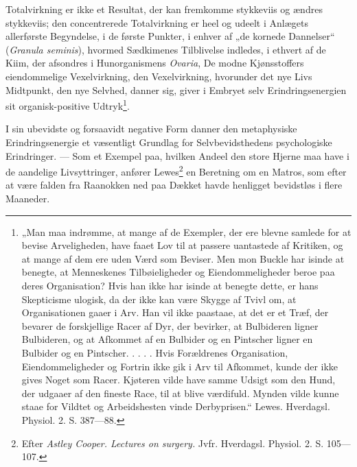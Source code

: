\documentclass[12pt,a4paper]{book}
\begin{document}
\setcounter{footnote}{0}
Totalvirkning er ikke et Resultat, der kan fremkomme stykkeviis og ændres
stykkeviis; den concentrerede Totalvirkning er heel og udeelt i Anlægets
allerførste Begyndelse, i de første Punkter, i enhver af „de kornede
Dannelser“ (\textit{Granula seminis}), hvormed Sædkimenes Tilblivelse
indledes, i ethvert af de Kiim, der afsondres i Hunorganismens
\textit{Ovaria},
De modne Kjønsstoffers eiendommelige Vexelvirkning, den Vexelvirkning,
hvorunder det nye Livs Midtpunkt, den nye Selvhed, danner sig, giver i
Embryet selv Erindringsenergien sit organisk-positive
Udtryk\footnote{„Man maa indrømme, at mange af de Exempler, der ere blevne
samlede for at bevise Arveligheden, have faaet Lov til at passere
uantastede af Kritiken, og at mange af dem ere uden Værd som Beviser. Men
mon Buckle har isinde at benegte, at Menneskenes Tilbøieligheder og
Eiendommeligheder beroe paa deres Organisation? Hvis han ikke har isinde
at benegte dette, er hans Skepticisme ulogisk, da der ikke kan være Skygge
af Tvivl om, at Organisationen gaaer i Arv. Han vil ikke paastaae, at det
er et Træf, der bevarer de forskjellige Racer af Dyr, der bevirker, at
Bulbideren ligner Bulbideren, og at Afkommet af en Bulbider og en Pintscher
ligner en Bulbider og en Pintscher. . . . . Hvis Forældrenes Organisation,
Eiendommeligheder og Fortrin ikke gik i Arv til Afkommet, kunde der ikke
gives Noget som Racer. Kjøteren vilde have samme Udsigt som den Hund, der
udgaaer af den fineste Race, til at blive værdifuld. Mynden vilde kunne
staae for Vildtet og Arbeidshesten vinde Derbyprisen.“ Lewes. Hverdagsl.
Physiol. 2. S. 387---88.}.

I sin ubevidste og forsaavidt negative Form danner den metaphysiske
Erindringsenergie et væsentligt Grundlag for Selvbevidsthedens
psychologiske Erindringer. --- Som et Exempel paa, hvilken Andeel den
store Hjerne maa have i de aandelige Livsyttringer, anfører
Lewes\footnote{Efter \textit{Astley Cooper. Lectures on surgery.} Jvfr.
Hverdagsl. Physiol. 2. S. 105---107.} en Beretning om en Matros, som efter
at være falden fra Raanokken ned paa Dækket havde henligget bevidstløs i
flere Maaneder.
\end{document}
